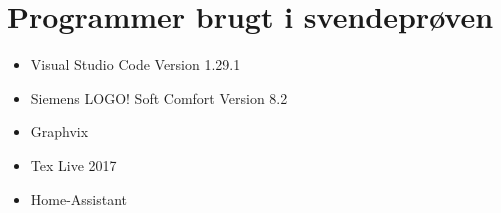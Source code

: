 \section{Programmer brugt i svendeprøven}
\begin{itemize}
    \item Visual Studio Code Version 1.29.1
    \item Siemens LOGO! Soft Comfort Version 8.2
    \item Graphvix
    \item Tex Live 2017
    \item Home-Assistant
\end{itemize}